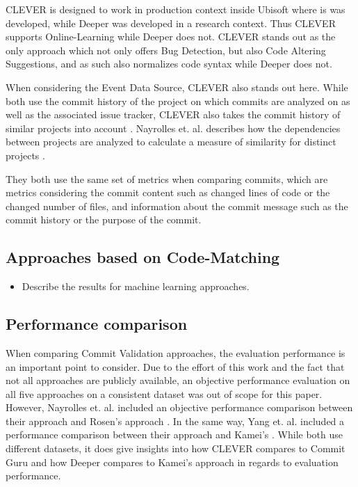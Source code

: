 CLEVER is designed to work in production context inside Ubisoft where is was developed, while Deeper was developed in a research context. Thus CLEVER supports Online-Learning while Deeper does not. CLEVER stands out as the only approach which not only offers Bug Detection, but also Code Altering Suggestions, and as such also normalizes code syntax while Deeper does not. \cite{Nayrolles2018, Yang2015}

When considering the Event Data Source, CLEVER also stands out here. While both use the commit history of the project on which commits are analyzed on as well as the associated issue tracker, CLEVER also takes the commit history of similar projects into account \cite{Nayrolles2018, Yang2015}. Nayrolles et. al. describes how the dependencies between projects are analyzed to calculate a measure of similarity for distinct projects \cite{Nayrolles2018}.


They both use the same set of metrics when comparing commits, which are metrics considering the commit content such as changed lines of code or the changed number of files, and information about the 
commit message %
such as the commit history or the purpose of the commit.

\subsection{Approaches based on Code-Matching}
\begin{itemize}
\item Describe the results for machine learning approaches.
\end{itemize}

\subsection{Performance comparison}

When comparing Commit Validation approaches, the evaluation performance is an important point to consider. Due to the effort of this work and the fact that not all approaches are publicly available, an objective performance evaluation on all five approaches on a consistent dataset was out of scope for this paper. However, Nayrolles et. al. included an objective performance comparison between their approach and Rosen's approach \cite{Nayrolles2018}. In the same 
way, %
Yang et. al. included a performance comparison between their approach and Kamei's \cite{Yang2015}. While both use different datasets, it does give insights into how CLEVER compares to Commit Guru and how Deeper compares to Kamei's approach in regards to evaluation performance.

